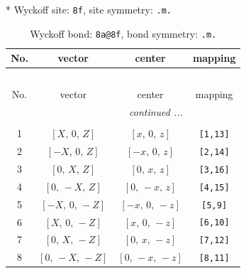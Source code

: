 \documentclass[fleqn,8pt]{jsarticle}
\begin{document}
* Wyckoff site: {\tt 8f}, site symmetry: {\tt .m.}
\renewcommand{\arraystretch}{1.2}
\begin{longtable}{cccc}
\caption{Wyckoff bond: {\tt 8a@8f}, bond symmetry: {\tt .m.}}
 \\
 \hline \hline
No. & vector & center & mapping \\ \hline \endfirsthead

\multicolumn{3}{l}{\tablename\ \thetable{}} \\
 \hline \hline
No. & vector & center & mapping \\ \hline \endhead

 \hline \hline
\multicolumn{3}{r}{\footnotesize\it continued ...} \\ \endfoot

 \hline \hline
\multicolumn{3}{r}{} \\ \endlastfoot

1 & $\left[ X,\, 0,\, Z \right]$ & $\left[ x,\, 0,\, z \right]$ & {\tt [1,13]} \\ \hline
2 & $\left[ - X,\, 0,\, Z \right]$ & $\left[ - x,\, 0,\, z \right]$ & {\tt [2,14]} \\ \hline
3 & $\left[ 0,\, X,\, Z \right]$ & $\left[ 0,\, x,\, z \right]$ & {\tt [3,16]} \\ \hline
4 & $\left[ 0,\, - X,\, Z \right]$ & $\left[ 0,\, - x,\, z \right]$ & {\tt [4,15]} \\ \hline
5 & $\left[ - X,\, 0,\, - Z \right]$ & $\left[ - x,\, 0,\, - z \right]$ & {\tt [5,9]} \\ \hline
6 & $\left[ X,\, 0,\, - Z \right]$ & $\left[ x,\, 0,\, - z \right]$ & {\tt [6,10]} \\ \hline
7 & $\left[ 0,\, X,\, - Z \right]$ & $\left[ 0,\, x,\, - z \right]$ & {\tt [7,12]} \\ \hline
8 & $\left[ 0,\, - X,\, - Z \right]$ & $\left[ 0,\, - x,\, - z \right]$ & {\tt [8,11]} \\
\end{longtable}
\renewcommand{\arraystretch}{1.2}
\end{document}
